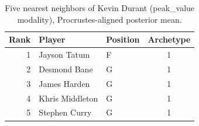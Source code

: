 \begin{table}[htbp]
  \centering\small
  \begin{tabular}{rllc}
    \toprule
    Rank & Player & Position & Archetype \\
    \midrule
    1 & Jayson Tatum & F & 1 \\
    2 & Desmond Bane & G & 1 \\
    3 & James Harden & G & 1 \\
    4 & Khris Middleton & G & 1 \\
    5 & Stephen Curry & G & 1 \\
    \bottomrule
  \end{tabular}
  \caption{Five nearest neighbors of Kevin Durant (peak_value modality), Procrustes-aligned posterior mean.}
  \label{tab:Kevin_Durant_neighbors_peak_value}
\end{table}

